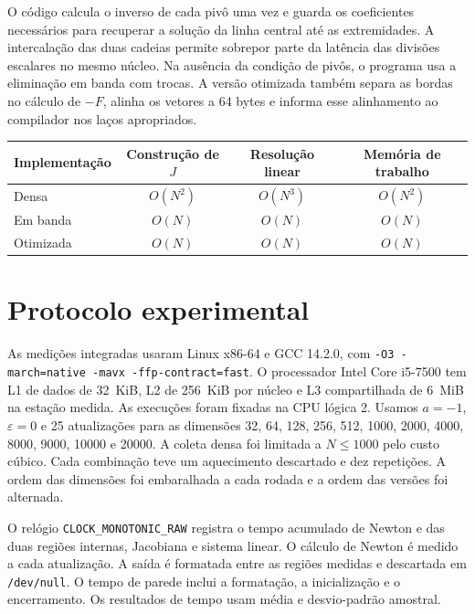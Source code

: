 \documentclass[11pt,a4paper]{article}
\begin{document}
O código calcula o inverso de cada pivô uma vez e guarda os
coeficientes necessários para recuperar a solução da linha central
até as extremidades. A intercalação das duas cadeias permite
sobrepor parte da latência das divisões escalares no mesmo núcleo.
Na ausência da condição de pivôs, o programa usa a eliminação em
banda com trocas. A versão otimizada também separa as bordas no
cálculo de $-F$, alinha os vetores a 64 bytes e informa esse
alinhamento ao compilador nos laços apropriados.

\begin{center}
\begin{tabular}{lccc}
\toprule
Implementação & Construção de $J$ & Resolução linear & Memória de trabalho \\
\midrule
Densa & $O(N^2)$ & $O(N^3)$ & $O(N^2)$ \\
Em banda & $O(N)$ & $O(N)$ & $O(N)$ \\
Otimizada & $O(N)$ & $O(N)$ & $O(N)$ \\
\bottomrule
\end{tabular}
\end{center}

\section{Protocolo experimental}

As medições integradas usaram Linux x86-64 e GCC 14.2.0, com
\texttt{-O3 -march=native -mavx -ffp-contract=fast}. O processador
Intel Core i5-7500 \cite{intel} tem L1 de dados de 32~KiB, L2 de
256~KiB por núcleo e L3 compartilhada de 6~MiB na estação medida.
As execuções foram fixadas na CPU lógica 2. Usamos $a=-1$,
$\varepsilon=0$ e 25 atualizações para as dimensões 32, 64, 128, 256,
512, 1000, 2000, 4000, 8000, 9000, 10000 e 20000.
A coleta densa foi limitada a $N\leq1000$ pelo custo cúbico.
Cada combinação teve um aquecimento descartado e dez repetições.
A ordem das dimensões foi embaralhada a cada rodada e a ordem das
versões foi alternada.

O relógio \texttt{CLOCK\_MONOTONIC\_RAW} registra o tempo acumulado de
Newton e das duas regiões internas, Jacobiana e sistema linear.
O cálculo de Newton é medido a cada atualização. A saída é
formatada entre as regiões medidas e descartada em \texttt{/dev/null}.
O tempo de parede inclui a formatação, a inicialização e o encerramento.
Os resultados de tempo usam média e desvio-padrão amostral.
\end{document}
